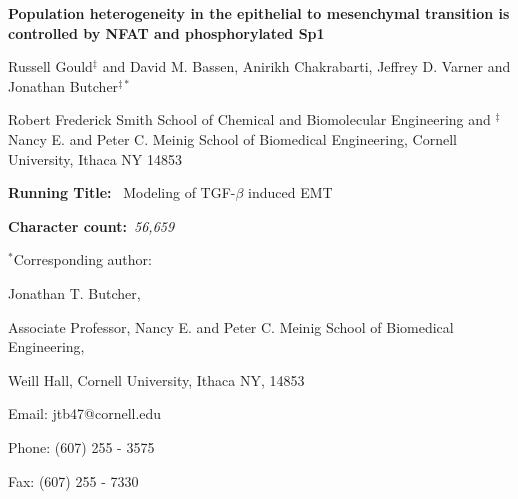 \documentclass[12pt]{article}
\begin{document}
\begin{titlepage}
{\par\centering\textbf{\Large Population heterogeneity in the epithelial to mesenchymal transition is controlled by NFAT and phosphorylated Sp1}}
\vspace{0.05in}
{\par \centering Russell Gould$^{\ddag}$ and David M. Bassen, Anirikh Chakrabarti, Jeffrey D. Varner and Jonathan Butcher$^{\ddag *}$}
\vspace{0.05in}
{\par \centering Robert Frederick Smith School of Chemical and Biomolecular Engineering and $^{\ddag}$Nancy E. and Peter C. Meinig School of Biomedical Engineering, Cornell University, Ithaca NY 14853}
\vspace{0.1in}
{\par \centering \textbf{Running Title:}~ Modeling of TGF-$\beta$ induced EMT}
\vspace{0.1in}
{\par \centering \textbf{Character count:}~\emph{56,659}}
\vspace{0.1in}
{\par \centering $^{*}$Corresponding author:}
\vspace{0.1in}
{\par \centering Jonathan T. Butcher,}
{\par \centering Associate Professor, Nancy E. and Peter C. Meinig School of Biomedical Engineering,}
{\par {} Weill Hall, Cornell University, Ithaca NY, 14853}
{\par \centering Email: jtb47@cornell.edu}
{\par \centering Phone: (607) 255 - 3575}
{\par \centering Fax: (607) 255 - 7330}
\end{titlepage}
\date{}
\thispagestyle{empty}
\pagebreak
\end{document}
